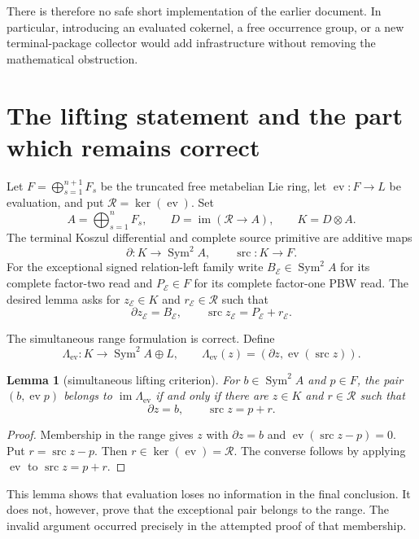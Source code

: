 \documentclass[11pt]{article}
\newtheorem{lemma}[theorem]{Lemma}
\theoremstyle{definition}
\theoremstyle{remark}
\newcommand{\Rel}{\mathcal R}
\newcommand{\Sym}{\operatorname{Sym}}
\newcommand{\ev}{\operatorname{ev}}
\newcommand{\src}{\operatorname{src}}
\newcommand{\im}{\operatorname{im}}
\begin{document}
There is therefore no safe short implementation of the earlier document.
In particular, introducing an evaluated cokernel, a free occurrence group,
or a new terminal-package collector would add infrastructure without
removing the mathematical obstruction.

\section{The lifting statement and the part which remains correct}

Let \(F=\bigoplus_{s=1}^{n+1}F_s\) be the truncated free metabelian Lie
ring, let \(\ev:F\to L\) be evaluation, and put
\(\Rel=\ker(\ev)\).  Set
\[
 A=\bigoplus_{s=1}^{n}F_s,
 \qquad D=\im(\Rel\to A),
 \qquad K=D\otimes A.
\]
The terminal Koszul differential and complete source primitive are additive
maps
\[
 \partial:K\longrightarrow\Sym^2A,
 \qquad
 \src:K\longrightarrow F.
\]
For the exceptional signed relation-left family write
\(B_{\mathcal E}\in\Sym^2A\) for its complete factor-two read and
\(P_{\mathcal E}\in F\) for its complete factor-one PBW read.  The desired
lemma asks for \(z_{\mathcal E}\in K\) and \(r_{\mathcal E}\in\Rel\) such
that
\begin{equation}
 \partial z_{\mathcal E}=B_{\mathcal E},
 \qquad
 \src z_{\mathcal E}=P_{\mathcal E}+r_{\mathcal E}.       \label{eq:target}
\end{equation}

The simultaneous range formulation is correct.  Define
\[
 \Lambda_{\mathrm{ev}}:K\longrightarrow\Sym^2A\oplus L,
 \qquad
 \Lambda_{\mathrm{ev}}(z)=(\partial z,\ev(\src z)).
\]

\begin{lemma}[simultaneous lifting criterion]\label{lem:range}
For \(b\in\Sym^2A\) and \(p\in F\), the pair
\((b,\ev p)\) belongs to \(\im\Lambda_{\mathrm{ev}}\) if and only if there
are \(z\in K\) and \(r\in\Rel\) such that
\[
                         \partial z=b,
 \qquad                  \src z=p+r.
\]
\end{lemma}

\begin{proof}
Membership in the range gives \(z\) with
\(\partial z=b\) and \(\ev(\src z-p)=0\).  Put
\(r=\src z-p\).  Then \(r\in\ker(\ev)=\Rel\).  The converse follows by
applying \(\ev\) to \(\src z=p+r\).
\end{proof}

This lemma shows that evaluation loses no information in the final
conclusion.  It does not, however, prove that the exceptional pair belongs
to the range.  The invalid argument occurred precisely in the attempted
proof of that membership.
\end{document}
